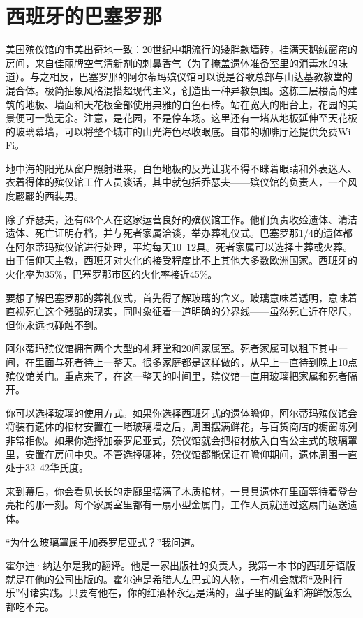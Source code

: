 \documentclass[12pt,oneside]{book}
\begin{document}
\section{西班牙的巴塞罗那}
\begin{bookref}[frametitle={\cite{好好告别}}]

美国殡仪馆的审美出奇地一致：20世纪中期流行的矮胖款墙砖，挂满天鹅绒窗帘的房间，来自佳丽牌空气清新剂的刺鼻香气（为了掩盖遗体准备室里的消毒水的味道）。与之相反，巴塞罗那的阿尔蒂玛殡仪馆可以说是谷歌总部与山达基教教堂的混合体。极简抽象风格混搭超现代主义，创造出一种异教氛围。这栋三层楼高的建筑的地板、墙面和天花板全部使用典雅的白色石砖。站在宽大的阳台上，花园的美景便可一览无余。注意，是花园，不是停车场。这里还有一堵从地板延伸至天花板的玻璃幕墙，可以将整个城市的山光海色尽收眼底。自带的咖啡厅还提供免费Wi-Fi。

地中海的阳光从窗户照射进来，白色地板的反光让我不得不眯着眼睛和外表迷人、衣着得体的殡仪馆工作人员谈话，其中就包括乔瑟夫——殡仪馆的负责人，一个风度翩翩的西装男。

除了乔瑟夫，还有63个人在这家运营良好的殡仪馆工作。他们负责收殓遗体、清洁遗体、死亡证明存档，并与死者家属洽谈，举办葬礼仪式。巴塞罗那1/4的遗体都在阿尔蒂玛殡仪馆进行处理，平均每天10~12具。死者家属可以选择土葬或火葬。由于信仰天主教，西班牙对火化的接受程度比不上其他大多数欧洲国家。西班牙的火化率为35\%，巴塞罗那市区的火化率接近45\%。

要想了解巴塞罗那的葬礼仪式，首先得了解玻璃的含义。玻璃意味着透明，意味着直视死亡这个残酷的现实，同时象征着一道明确的分界线——虽然死亡近在咫尺，但你永远也碰触不到。

阿尔蒂玛殡仪馆拥有两个大型的礼拜堂和20间家属室。死者家属可以租下其中一间，在里面与死者待上一整天。很多家庭都是这样做的，从早上一直待到晚上10点殡仪馆关门。重点来了，在这一整天的时间里，殡仪馆一直用玻璃把家属和死者隔开。

你可以选择玻璃的使用方式。如果你选择西班牙式的遗体瞻仰，阿尔蒂玛殡仪馆会将装有遗体的棺材安置在一堵玻璃墙之后，周围摆满鲜花，与百货商店的橱窗陈列非常相似。如果你选择加泰罗尼亚式，殡仪馆就会把棺材放入白雪公主式的玻璃罩里，安置在房间中央。不管选择哪种，殡仪馆都能保证在瞻仰期间，遗体周围一直处于32~42华氏度。

来到幕后，你会看见长长的走廊里摆满了木质棺材，一具具遗体在里面等待着登台亮相的那一刻。每个家属室里都有一扇小型金属门，工作人员就通过这扇门运送遗体。

“为什么玻璃罩属于加泰罗尼亚式？”我问道。

霍尔迪·纳达尔是我的翻译。他是一家出版社的负责人，我第一本书的西班牙语版就是在他的公司出版的。霍尔迪是希腊人左巴式的人物，一有机会就将“及时行乐”付诸实践。只要有他在，你的红酒杯永远是满的，盘子里的鱿鱼和海鲜饭怎么都吃不完。


\end{bookref}
\end{document}
